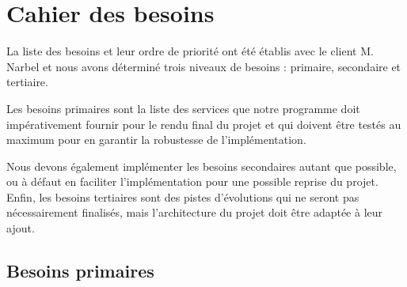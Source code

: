 \documentclass[a4paper]{report}
\begin{document}

\chapter{Cahier des besoins}

La liste des besoins et leur ordre de priorité ont été établis avec le client M. Narbel et nous avons déterminé trois niveaux de besoins : primaire, secondaire et tertiaire.

Les besoins primaires sont la liste des services que notre programme doit impérativement fournir pour le rendu final du projet et qui doivent être testés au maximum pour en garantir la robustesse de l'implémentation.

Nous devons également implémenter les besoins secondaires autant que possible, ou à défaut en faciliter l'implémentation pour une possible reprise du projet.
Enfin, les besoins tertiaires sont des pistes d'évolutions qui ne seront pas nécessairement finalisés, mais l'architecture du projet doit être adaptée à leur ajout.

\section{Besoins primaires} %
\end{document}
